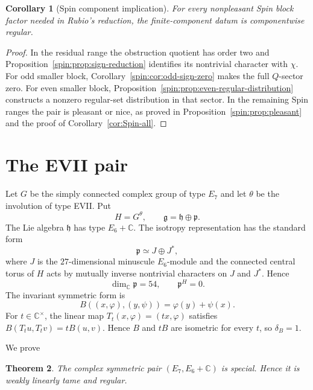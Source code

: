 \documentclass[10pt,a4paper]{amsart}
\numberwithin{equation}{section}
\newtheorem{theorem}{Theorem}[section]
\newtheorem{corollary}[theorem]{Corollary}
\newcommand{\C}{\mathbb C}
\newcommand{\fg}{\mathfrak g}
\newcommand{\fh}{\mathfrak h}
\newcommand{\fp}{\mathfrak p}
\begin{document}
\begin{corollary}[Spin component implication]\label{cor:Spin-component}
For every nonpleasant Spin block factor needed in Rubio's reduction, the
finite-component datum is componentwise regular.
\end{corollary}

\begin{proof}
In the residual range the obstruction quotient has order two and
Proposition~\ref{spin:prop:sign-reduction} identifies its nontrivial character
with $\chi$.  For odd smaller block,
Corollary~\ref{spin:cor:odd-sign-zero} makes the full $Q$-sector zero.  For even
smaller block, Proposition~\ref{spin:prop:even-regular-distribution} constructs
a nonzero regular-set distribution in that sector.  In the remaining Spin
ranges the pair is pleasant or nice, as proved in
Proposition~\ref{spin:prop:pleasant} and the proof of
Corollary~\ref{cor:Spin-all}.
\end{proof}

\section{The EVII pair}\label{sec:EVII-family}
Let $G$ be the simply connected complex group of type $E_7$ and let $\theta$
be the involution of type EVII.  Put
\[
 H=G^\theta,
 \qquad
 \fg=\fh\oplus\fp.
\]
The Lie algebra $\fh$ has type $E_6+\C$.  The isotropy representation has the
standard form
\begin{equation}\label{evii:eq:EVII-p}
 \fp\simeq J\oplus J^*,
\end{equation}
where $J$ is the $27$-dimensional minuscule $E_6$-module and the connected
central torus of $H$ acts by mutually inverse nontrivial characters on $J$ and
$J^*$.  Hence
\begin{equation}\label{evii:eq:EVII-dim}
 \dim_{\C}\fp=54,
 \qquad
 \fp^H=0.
\end{equation}
The invariant symmetric form is
\begin{equation}\label{evii:eq:EVII-B}
 B((x,\varphi),(y,\psi))=\varphi(y)+\psi(x).
\end{equation}
For $t\in\C^\times$, the linear map
$T_t(x,\varphi)=(tx,\varphi)$ satisfies
$B(T_tu,T_tv)=tB(u,v)$.  Hence $B$ and $tB$ are isometric for every $t$, so
$\delta_B=1$.

We prove
\begin{theorem}\label{evii:thm:EVII-special}
The complex symmetric pair $(E_7,E_6+\C)$ is special.  Hence it is weakly
linearly tame and regular.
\end{theorem}
\end{document}
